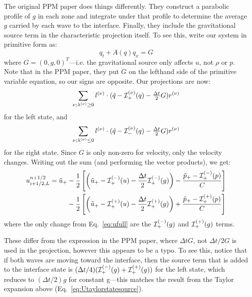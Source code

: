 \begin{itemize}
The original PPM paper does things differently.  They construct a parabolic
profile of $g$ in each zone and integrate under that profile to determine
the average $g$ carried by each wave to the interface.  Finally, they include
the gravitational source term in the characteristic projection itself.
To see this, write our system in primitive form as:
\begin{equation}
q_t + A(q) q_x = G
\end{equation}
where $G = (0, g, 0)^T$---i.e. the gravitational source only affects
$u$, not $\rho$ or $p$.  Note that in the PPM paper, they put $G$ on 
the lefthand side of the primitive variable equation, so our signs are
opposite.  Our projections are now:
\begin{equation}
\sum_{\nu; \lambda^{(\nu)} \ge 0}l^{(\nu)} \cdot (\tilde{q} - \mathcal{I}^{(\nu)}_+(q) - \tfrac{\Delta t}{2} G) r^{(\nu)}
\end{equation}
for the left state, and
\begin{equation}
\sum_{\nu; \lambda^{(\nu)} \le 0} l^{(\nu)} \cdot (\tilde{q} - \mathcal{I}^{(\nu)}_-(q) - \tfrac{\Delta t}{2} G) r^{(\nu)} 
\end{equation}
for the right state.  Since $G$ is only non-zero for velocity, only
the velocity changes.  Writing out the sum (and performing the vector products), we
get:
\begin{align}
u_{i+1/2,L}^{n+1/2} =
   \tilde{u}_+ 
  &- \frac{1}{2} \left [
      \left (\tilde{u}_+ - \mathcal{I}_+^{(-)}(u) - \frac{\Delta t}{2} \mathcal{I}^{(-)}_+(g) \right ) - 
       \frac{\tilde{p}_+ - \mathcal{I}_+^{(-)}(p)}{C} \right ] \nonumber \\
  &- \frac{1}{2} \left [
      \left (\tilde{u}_+ - \mathcal{I}_+^{(+)}(u) - \frac{\Delta t}{2} \mathcal{I}^{(+)}_+(g) \right ) +
       \frac{\tilde{p}_+ - \mathcal{I}_+^{(+)}(p)}{C} \right ]
\end{align}
where the only change from Eq.~\ref{eq:ufull} are the
$\mathcal{I}^{(-)}_+(g)$ and $\mathcal{I}^{(+)}_+(g)$ terms.  

These differ from the expression in the PPM paper, where $\Delta t G$,
not $\Delta t/2 G$ is used in the projection, however this appears to
be a typo.  To see this, notice that if both waves are moving toward
the interface, then the source term that is added to the interface
state is $(\Delta t/4) (\mathcal{I}_+^{(-)}(g) +
\mathcal{I}_+^{(+)}(g))$ for the left state, which reduces to $(\Delta
t/2) g$ for constant g---this matches the result from the Taylor
expansion above (Eq.~\ref{eq:Utaylorstatesource}).




\end{itemize}
